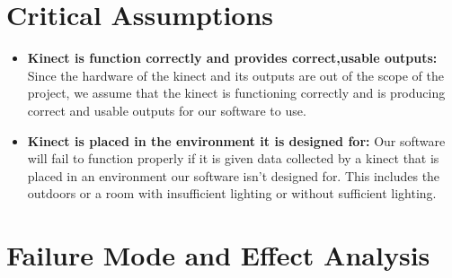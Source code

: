 \documentclass{article}
\begin{document}
\section{Critical Assumptions}

\begin{itemize}
\item  \textbf{Kinect is function correctly and provides correct,usable outputs:} Since the hardware of the kinect and its outputs are out of the scope of the project, we assume that the kinect is functioning correctly and is producing correct and usable outputs for our software to use. 

\item  \textbf{Kinect is placed in the environment it is designed for:} Our software will fail to function properly if it is given data collected by a kinect that is placed in an environment our software isn't designed for. This includes the outdoors or a room with insufficient lighting or without sufficient lighting.          

\end{itemize}

\section{Failure Mode and Effect Analysis}
\end{document}
